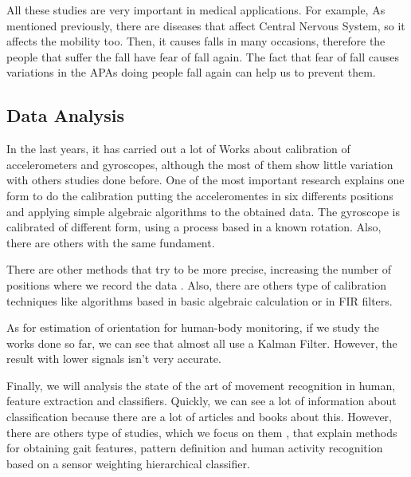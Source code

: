 All these studies are very important in medical applications. For example, As mentioned previously, there are diseases that affect Central Nervous System, so it affects  the mobility too. Then, it causes falls in many occasions, therefore  the people that suffer the fall have fear of fall again. The fact that fear of fall causes variations in the APAs doing people  fall again can help us to prevent them.

\subsection{Data Analysis}

In the last years, it has carried out a lot of Works about  calibration of accelerometers and gyroscopes, although the most of them show little variation with others studies done before. One of the most important research  \cite{Kian2011}explains one form to do the calibration putting the acceleromentes in six differents positions and applying  simple algebraic algorithms to the obtained data. The gyroscope is calibrated of different form, using a process based in a known rotation. Also, there are others with the same fundament.

There are other methods that try to be more precise, increasing the number of positions where we record the data \cite{Camps2009}. Also, there are others type of calibration techniques like algorithms based in basic algebraic calculation or in FIR filters. \cite{A.Olivares2013}

As for estimation of orientation for human-body monitoring, if we study the works done so far, we can see that almost all  use a Kalman Filter. However, the result with lower signals isn’t very accurate.\cite{A.Olivares2013}

Finally, we will analysis the state of the art of movement recognition in human, feature extraction and classifiers. Quickly, we can see a lot of information about classification because there are a lot of articles and books about this. However, there are others type of studies, which we focus on  them \cite{FrenkelToledo} \cite{Jeon}\cite{Banos2012}, that explain methods for obtaining gait features, pattern definition and human activity recognition based on a sensor weighting hierarchical classifier. 
